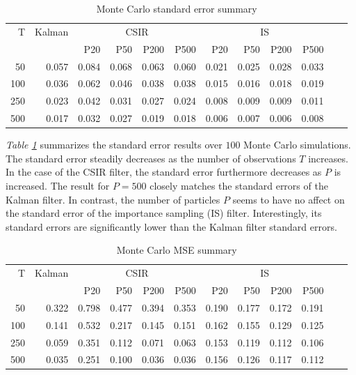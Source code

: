 \documentclass[11pt, oneside]{scrreprt}   	%
\begin{document}
\begin{table}[h!]
\centering
\begin{tabular}{rrrrrrrrrrrr}
\hline
T  & Kalman &  \multicolumn{4}{c}{CSIR} &  \multicolumn{4}{c}{IS}\\
\cline{3-10}
& & P20 & P50 & P200 & P500 & P20 & P50 & P200 & P500\\
\hline
50        & 0.057 & 0.084 & 0.068 & 0.063 & 0.060 & 0.021 & 0.025 & 0.028 & 0.033\\
100      & 0.036 & 0.062 & 0.046 & 0.038 & 0.038 & 0.015 & 0.016 & 0.018 & 0.019\\
250      & 0.023 & 0.042 & 0.031 & 0.027 & 0.024 & 0.008 & 0.009 & 0.009 & 0.011\\
500      & 0.017 & 0.032 & 0.027 & 0.019 & 0.018 & 0.006 & 0.007 & 0.006 & 0.008\\
\hline
\end{tabular}
\caption{Monte Carlo standard error summary}
\label{tab:param_inference_se}
\end{table}

\textit{Table \ref{tab:param_inference_se}} summarizes the standard error results over $100$ Monte Carlo simulations. The standard error steadily decreases as the number of observations $T$ increases. In the case of the CSIR filter, the standard error furthermore decreases as $P$ is increased. The result for $P=500$ closely matches the standard errors of the Kalman filter. In contrast, the number of particles $P$ seems to have no affect on the standard error of the importance sampling (IS) filter. Interestingly, its standard errors are significantly lower than the Kalman filter standard errors.\\

\begin{table}[h!]
\centering
\begin{tabular}{rrrrrrrrrrrr}
\hline
T  & Kalman &  \multicolumn{4}{c}{CSIR} &  \multicolumn{4}{c}{IS}\\
\cline{3-10}
& & P20 & P50 & P200 & P500 & P20 & P50 & P200 & P500\\
\hline
50        & 0.322 & 0.798 & 0.477 & 0.394 & 0.353 & 0.190 & 0.177 & 0.172 & 0.191\\
100      & 0.141 & 0.532 & 0.217 & 0.145 & 0.151 & 0.162 & 0.155 & 0.129 & 0.125\\
250      & 0.059 & 0.351 & 0.112 & 0.071 & 0.063 & 0.153 & 0.119 & 0.112 & 0.106\\
500      & 0.035 & 0.251 & 0.100 & 0.036 & 0.036 & 0.156 & 0.126 & 0.117 & 0.112\\
\hline
\end{tabular}
\caption{Monte Carlo MSE summary}
\label{tab:param_inference_mse}
\end{table}
\end{document}
